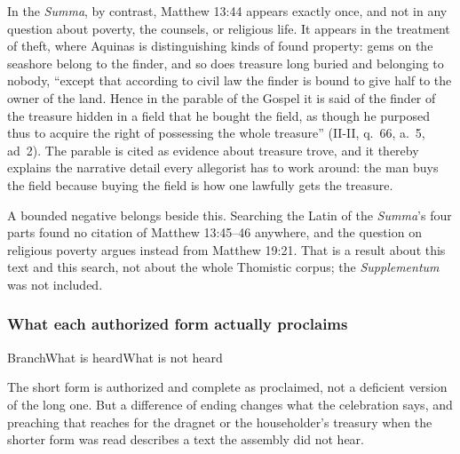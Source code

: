 In the \emph{Summa}, by contrast, Matthew 13:44 appears exactly once, and not in any question about poverty, the counsels, or religious life. It appears in the treatment of theft, where Aquinas is distinguishing kinds of found property: gems on the seashore belong to the finder, and so does treasure long buried and belonging to nobody, ``except that according to civil law the finder is bound to give half to the owner of the land. Hence in the parable of the Gospel it is said of the finder of the treasure hidden in a field that he bought the field, as though he purposed thus to acquire the right of possessing the whole treasure'' (II-II, q.~66, a.~5, ad~2). The parable is cited as evidence about treasure trove, and it thereby explains the narrative detail every allegorist has to work around: the man buys the field because buying the field is how one lawfully gets the treasure.

A bounded negative belongs beside this. Searching the Latin of the \emph{Summa}'s four parts found no citation of Matthew 13:45--46 anywhere, and the question on religious poverty argues instead from Matthew 19:21. That is a result about this text and this search, not about the whole Thomistic corpus; the \emph{Supplementum} was not included.

\subsubsection*{What each authorized form actually proclaims}

\begin{threecoltable}{Branch}{What is heard}{What is not heard}
\end{threecoltable}

The short form is authorized and complete as proclaimed, not a deficient version of the long one. But a difference of ending changes what the celebration says, and preaching that reaches for the dragnet or the householder's treasury when the shorter form was read describes a text the assembly did not hear.
